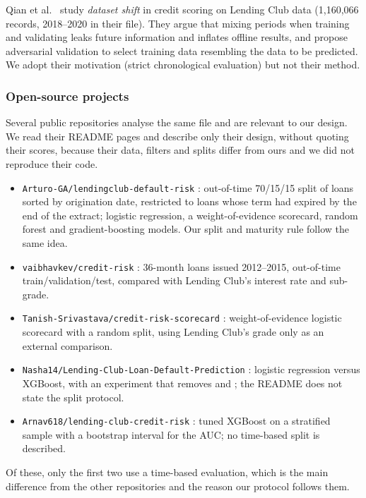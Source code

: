Qian et al.\ \cite{qian2021} study \emph{dataset shift} in credit scoring on Lending Club data (1,160,066 records, 2018--2020 in their file). They argue that mixing periods when training and validating leaks future information and inflates offline results, and propose adversarial validation to select training data resembling the data to be predicted. We adopt their motivation (strict chronological evaluation) but not their method.

\subsubsection{Open-source projects}

Several public repositories analyse the same file and are relevant to our design. We read their README pages and describe only their design, without quoting their scores, because their data, filters and splits differ from ours and we did not reproduce their code.
\begin{itemize}
    \item \texttt{Arturo-GA/lendingclub-default-risk} \cite{gh_arturo}: out-of-time 70/15/15 split of loans sorted by origination date, restricted to loans whose term had expired by the end of the extract; logistic regression, a weight-of-evidence scorecard, random forest and gradient-boosting models. Our split and maturity rule follow the same idea.
    \item \texttt{vaibhavkev/credit-risk} \cite{gh_vaibhav}: 36-month loans issued 2012--2015, out-of-time train/validation/test, compared with Lending Club's interest rate and sub-grade.
    \item \texttt{Tanish-Srivastava/credit-risk-scorecard} \cite{gh_tanish}: weight-of-evidence logistic scorecard with a random split, using Lending Club's grade only as an external comparison.
    \item \texttt{Nasha14/Lending-Club-Loan-Default-Prediction} \cite{gh_nasha}: logistic regression versus XGBoost, with an experiment that removes  and ; the README does not state the split protocol.
    \item \texttt{Arnav618/lending-club-credit-risk} \cite{gh_arnav}: tuned XGBoost on a stratified sample with a bootstrap interval for the AUC; no time-based split is described.
\end{itemize}
Of these, only the first two use a time-based evaluation, which is the main difference from the other repositories and the reason our protocol follows them.


